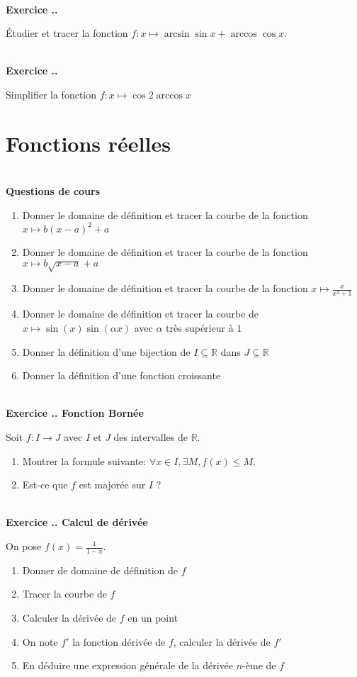 \documentclass{article}
\newcommand{\ds}{\vspace{0.4\baselineskip}}
\newcommand{\mb}[1]{\mathbb{#1}}
\newcounter{exo}
\newcommand{\exercice}[1][\null]{\textbf{\\ \large Exercice \thesection.\theexo. \normalsize #1} \addtocounter{exo}{1}}
\newcommand{\cours}{\textbf{\ds \\ \large Questions de cours}}
\begin{document}
\exercice 

Étudier et tracer la fonction $f : x \mapsto \arcsin \sin x + \arccos \cos x$.

\exercice 

Simplifier la fonction $f : x \mapsto \cos 2 \arccos x$


\section{Fonctions réelles}

\cours 

\begin{enumerate}
    \item Donner le domaine de définition et tracer 
        la courbe de la fonction $x \mapsto b (x - a)^2 + a$

    \item Donner le domaine de définition et tracer 
        la courbe de la fonction $x \mapsto b \sqrt{x - a} + a$

    \item Donner le domaine de définition et tracer 
        la courbe de la fonction $x \mapsto \frac{x}{x^2 + 1}$


    \item Donner le domaine de définition et tracer la courbe 
        de $x \mapsto \sin(x) \sin (\alpha x)$ avec $\alpha$ très
        supérieur à $1$

    \item Donner la définition d'une bijection de $I \subseteq \mb{R}$
        dans $J \subseteq \mb{R}$

    \item Donner la définition d'une fonction croissante 
\end{enumerate}

\exercice[Fonction Bornée]

Soit $f : I \to J$ avec $I$ et $J$ des intervalles de $\mb{R}$.

\begin{enumerate}
    \item Montrer la formule suivante: $\forall x \in I, \exists M, f(x) \leq
        M$.

    \item Est-ce que $f$ est majorée sur $I$ ?
\end{enumerate}

\exercice[Calcul de dérivée]

On pose $f(x) = \frac{1}{1-x}$.

\begin{enumerate}
    \item Donner de domaine de définition de $f$
    \item Tracer la courbe de $f$
    \item Calculer la dérivée de $f$ en un point
    \item On note $f'$ la fonction dérivée de $f$,
        calculer la dérivée de $f'$
    \item En déduire une expression générale 
        de la dérivée $n$-ème de $f$
\end{enumerate}
\end{document}
